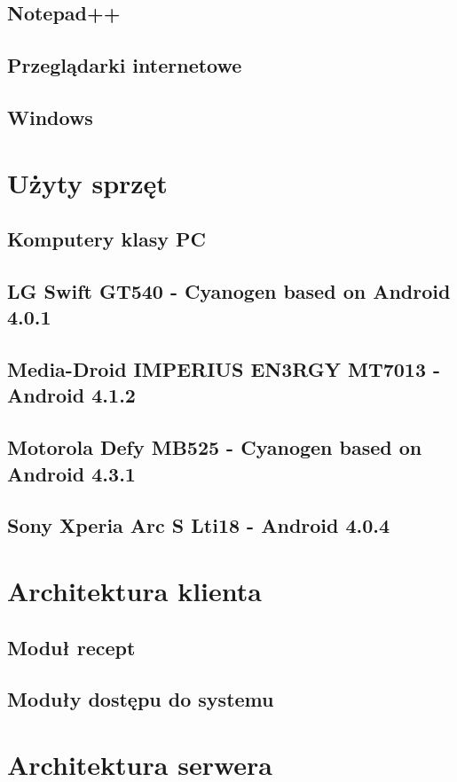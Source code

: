 \documentclass[11pt,a4paper,polish,thesis]{dcsbook}
\begin{document}
\subsection{Notepad++}
\subsection{Przeglądarki internetowe}
\subsection{Windows}
\section{Użyty sprzęt}
\subsection{Komputery klasy PC}
\subsection{LG Swift GT540 - Cyanogen based on Android 4.0.1}
\subsection{Media-Droid IMPERIUS EN3RGY MT7013 - Android 4.1.2}
\subsection{Motorola Defy MB525 - Cyanogen based on Android 4.3.1}
\subsection{Sony Xperia Arc S Lti18 - Android 4.0.4}

\section{Architektura klienta}
\subsection{Moduł recept}
\subsection{Moduły dostępu do systemu}

\section{Architektura serwera}
\end{document}
